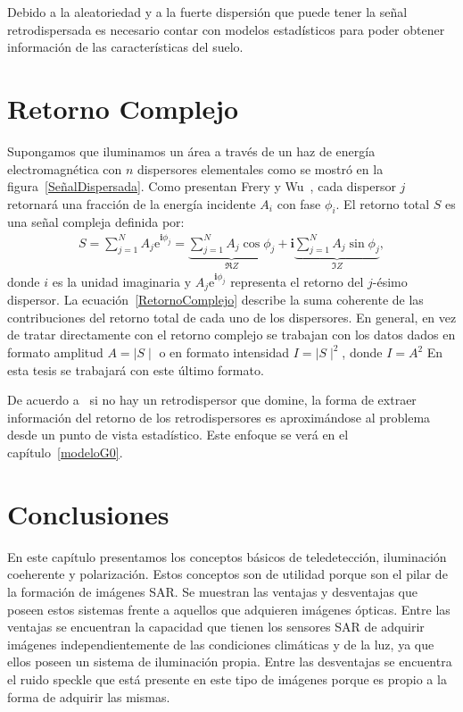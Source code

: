 Debido a la aleatoriedad y a la fuerte dispersión que puede tener la señal retrodispersada es necesario contar con modelos estadísticos para poder obtener información de las características del suelo.

\section{Retorno Complejo}
\label{RetornoComplejo}

Supongamos que iluminamos un área a través de un haz de energía electromagnética con $n$ dispersores elementales como se mostró en la figura~\ref{SeñalDispersada}. Como presentan Frery y Wu~\cite{FreryLibro2019}, cada dispersor $j$ retornará una fracción de la energía incidente $A_i$ con fase $\phi_i$. El retorno total $S$ es una señal compleja definida por:
\begin{align}
S = \sum_{j=1}^{N} A_j \mathrm{e}^{\mathbf i \phi_j} = 
\underbrace{{\sum_{j=1}^{N} A_j \cos \phi_j}}_{\Re{Z}} +\mathbf i \underbrace{ \sum_{j=1}^{N} A_j \sin \phi_j}_{\Im{Z}}, 
\label{RetornoComplejo}
\end{align}
donde $i$ es la unidad imaginaria y $A_j \mathrm{e}^{\mathbf i \phi_j}$ representa el retorno del $j$-ésimo dispersor. La ecuación~\eqref{RetornoComplejo} describe la suma coherente de las contribuciones del retorno total de cada uno de los dispersores. En general, en vez de tratar directamente con el retorno complejo se trabajan con los datos dados en formato amplitud $A=\mid S \mid$ o  en formato intensidad $I=\mid S \mid^2$, donde $I=A^2$ En esta tesis se trabajará con este último formato.

De acuerdo a~\cite{Quegan1994} si no hay un retrodispersor que domine, la forma de extraer información del retorno de los retrodispersores es aproximándose al problema desde un punto de vista estadístico. Este enfoque se verá en el capítulo~\ref{modeloG0}.




\section{Conclusiones}

En este capítulo presentamos los conceptos básicos de teledetección, iluminación coeherente y polarización. Estos conceptos son de utilidad porque son el pilar de la formación de imágenes SAR. Se muestran las ventajas y desventajas que poseen estos sistemas frente a aquellos que adquieren imágenes ópticas. Entre las ventajas se encuentran la capacidad que tienen los sensores SAR de adquirir imágenes independientemente de las condiciones climáticas y de la luz, ya que ellos poseen un sistema de iluminación propia. Entre las desventajas se encuentra el ruido speckle que está presente en este tipo de imágenes porque es propio a la forma de adquirir las mismas. 

